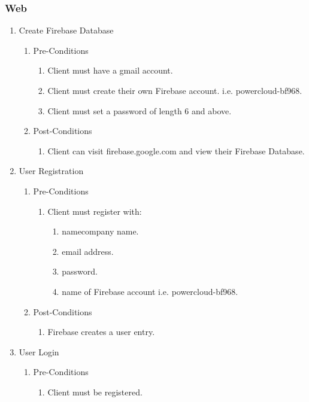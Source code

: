 \documentclass{article}
\begin{document}
	\subsubsection{Web}
		\begin{enumerate}
	\item	Create Firebase Database
	\begin{enumerate}
		\item  Pre-Conditions
		\begin{enumerate}
			\item	Client must have a gmail account.
			\item	Client must create their own Firebase account. i.e. powercloud-bf968.
			\item	Client must set a password of length 6 and above.
		\end{enumerate}
		\item  Post-Conditions		
		\begin{enumerate}
			\item	Client can visit firebase.google.com and view their Firebase Database.
		\end{enumerate}
	\end{enumerate}
	\item	User Registration
	\begin{enumerate}
		\item  Pre-Conditions
		\begin{enumerate}
			\item	Client must register with:
			\begin{enumerate}
				\item	namecompany name.
				\item	email address.
				\item	password.
				\item	name of Firebase account i.e. powercloud-bf968.
			\end{enumerate}
		\end{enumerate}
		\item  Post-Conditions		
		\begin{enumerate}
			\item	Firebase creates a user entry.
		\end{enumerate}
	\end{enumerate}
	\item	User Login
	\begin{enumerate}
		\item  Pre-Conditions
		\begin{enumerate}
			\item	Client must be registered.

\end{enumerate}
\end{enumerate}
\end{enumerate}
\end{document}
